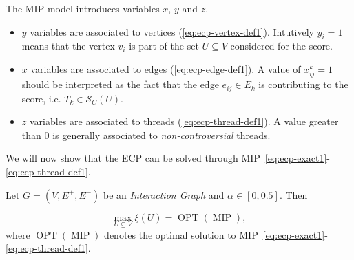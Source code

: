 The \acrshort{MIP} model introduces variables $x$, $y$ and $z$.
\begin{itemize}
	\item $y$ variables are associated to vertices
	      (\autoref{eq:ecp-vertex-def1}). Intutively $y_i = 1$ means that the
	      vertex $v_{i} $ is part of the set $U \subseteq V$ considered for the
	      score.
	\item $x$ variables are associated to edges (\autoref{eq:ecp-edge-def1}).
	      A value of $x_{ij}^{k} = 1$ should be interpreted as the fact that
	      the edge $e_{ij} \in E_k$ is contributing to the score,
	      i.e. $T_k \in \mathcal{S}_{C} (U)$.
	\item $z$ variables are associated to threads
	      (\autoref{eq:ecp-thread-def1}). A value greater than 0
	      is generally associated to \emph{non-controversial} threads.
\end{itemize}

We will now show that the \acrshort{ECP} can be solved through
MIP~\eqref{eq:ecp-exact1}-\eqref{eq:ecp-thread-def1}.

\begin{theorem}
	\label{th:ecp-mip}
	Let $G = (V, E^{+}, E^{-})$ be an \emph{Interaction Graph} and $\alpha \in
		[0, 0.5]$. Then

	\begin{equation}
		\max_{U \subseteq V} \xi(U) = \operatorname{OPT}(\operatorname{MIP}),
	\end{equation}
	where $\operatorname{OPT}(\operatorname{MIP})$ denotes the optimal solution to
	MIP~\eqref{eq:ecp-exact1}-\eqref{eq:ecp-thread-def1}.
\end{theorem}

